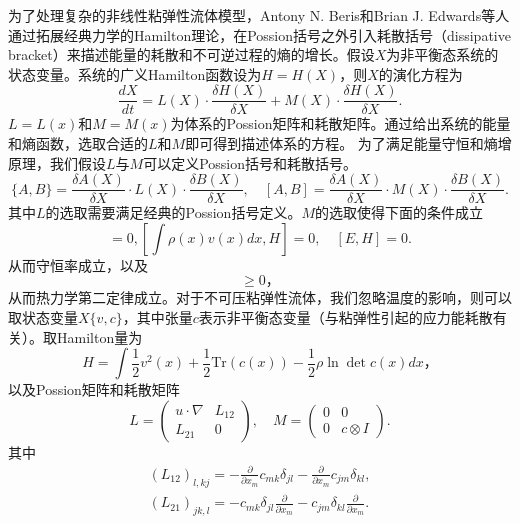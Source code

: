 \documentclass{article}
\begin{document}
为了处理复杂的非线性粘弹性流体模型，Antony N. Beris和Brian J. Edwards等人通过拓展经典力学的Hamilton理论，在Possion括号之外引入耗散括号（dissipative bracket）来描述能量的耗散和不可逆过程的熵的增长\cite{edwards1990remarks,beris2013thermodynamics}。假设$X$为非平衡态系统的状态变量。系统的广义Hamilton函数设为$H=H(X)$，则$X$的演化方程为
\begin{equation*}
	\frac{dX}{dt} = L(X) \cdot \frac{\delta H(X)}{\delta X} + M(X) \cdot \frac{\delta H(X)}{\delta X} . 
\end{equation*}
$L=L(x)$和$M=M(x)$为体系的Possion矩阵和耗散矩阵。通过给出系统的能量和熵函数，选取合适的$L$和$M$即可得到描述体系的方程。 为了满足能量守恒和熵增原理，我们假设$L$与$M$可以定义Possion括号和耗散括号。
\begin{equation*}
	\{ A,B \} = \frac{\delta A(X)}{\delta X} \cdot L(X) \cdot \frac{\delta B(X)}{\delta X}, \quad  [ A,B ] = \frac{\delta A(X)}{\delta X} \cdot M(X) \cdot \frac{\delta B(X)}{\delta X}. 
\end{equation*}
其中$L$的选取需要满足经典的Possion括号定义。$M$的选取使得下面的条件成立
\begin{equation*}
	[\int \rho(x) dx, H]=0,[\int \rho(x) v(x) dx, H]=0, \quad [E,H] = 0.
\end{equation*}
从而守恒率成立，以及
\begin{equation*}
	[S,H] \ge 0，
\end{equation*}
从而热力学第二定律成立。对于不可压粘弹性流体，我们忽略温度的影响，则可以取状态变量$X 
 \{v,c\}$，其中张量$c$表示非平衡态变量（与粘弹性引起的应力能耗散有关）。取Hamilton量为
 \begin{equation*}
 	H = \int \frac{1}{2} v^2(x) + \frac{1}{2} \mbox{
 	Tr}(c(x))- \frac{1}{2} \rho \ln \det c(x) dx，
 \end{equation*}
以及Possion矩阵和耗散矩阵
\begin{equation*}
	L = \left( \begin{array}{cc} 
			u \cdot \nabla &  L_{12} \\
			L_{21}& 0
		\end{array}\right), \quad
	M =	\left( \begin{array}{cc} 
			0  & 0 \\
			0  & c \otimes I
		\end{array}\right).
\end{equation*}
其中
\begin{eqnarray*}
	(L_{12})_{l,kj} = - \frac{\partial}{\partial x_m} c_{mk} \delta_{jl} -  \frac{\partial}{\partial x_m} c_{jm} \delta_{kl}, \\
	(L_{21})_{jk,l} = -c_{mk} \delta_{jl} \frac{\partial}{\partial x_m} - c_{jm} \delta_{kl} \frac{\partial}{\partial x_m}.
\end{eqnarray*}
\end{document}
